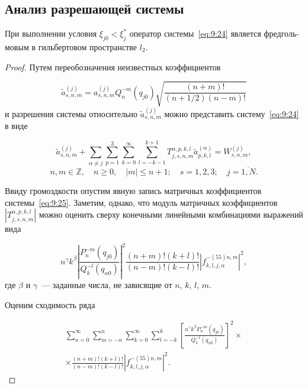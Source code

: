 \begin{russian}
\section{Анализ разрешающей системы}

\begin{theorem}
При выполнении условия ${\xi _{j0}} < \xi _j^*$ оператор системы~\eqref{eq:9:24} является фредгольмовым в гильбертовом пространстве $l_2$.
\end{theorem}

\begin{proof}
Путем переобозначения неизвестных коэффициентов

\begin{equation}
\tilde a_{s,n,m}^{(j)} = a_{s,n,m}^{(j)}Q_n^{ - m}({q_{j0}})\sqrt {\frac{{(n + m)!}}{{(n + 1/2)(n - m)!}}}
\end{equation}
и разрешения системы относительно $\tilde a_{s,n,m}^{(j)}$ можно представить систему~\eqref{eq:9:24} в виде

\begin{equation}
\tilde a_{s,n,m}^{(j)} + \sum\limits_{\alpha\neq j}\sum\limits_{p = 1}^3 {\sum\limits_{k = 0}^\infty  {\sum\limits_{l =  - k - 1}^{k + 1} {T_{j,s,n,m}^{\alpha,p,k,l}} } } \tilde a_{p,k,l}^{(\alpha)} = W_{s,n,m}^{(j)},
\label{eq:9:25}
\end{equation}
$$n,m \in\mathbb{Z},\quad n \ge 0,\quad |m| \le n + 1;\quad s = 1,2,3;\quad j = \overline{1,N}.$$

Ввиду громоздкости опустим явную запись матричных коэффициентов системы~\eqref{eq:9:25}. Заметим, однако, что модуль матричных коэффициентов $\left|T_{j,s,n,m}^{\alpha,p,k,l}\right|$ можно оценить сверху конечными линейными комбинациями выражений вида

\begin{equation}
{n^\gamma }{k^\beta }{\left| {\frac{{P_n^{ - m}\left( {{q_{j0}}} \right)}}{{Q_k^{ - l}\left( {{q _{\alpha 0}}} \right)}}} \right|^2}\frac{{(n + m)!(k + l)!}}{{(n - m)!(k - l)!}}{\left| {f_{k,l,j,\alpha}^{-(55)n,m}} \right|^2},
\label{eq:9:26}
\end{equation}
где $\beta$ и $\gamma$~--- заданные числа, не зависящие от $n$, $k$, $l$, $m$.

Оценим сходимость ряда

\begin{multline}
\sum\limits_{n = 0}^\infty\sum\limits_{m =  - n}^n\sum\limits_{k = 0}^\infty  \sum\limits_{l =  - k}^k{{\left[ {\frac{{{n^\gamma }{k^\beta }P_n^{ - m}({q_{j0}})}}{{Q_k^{ - l}\left( {{q _{\alpha 0}}} \right)}}} \right]}^2}\times \\
\times\frac{{(n + m)!(k + l)!}}{{(n - m)!(k - l)!}}{{\left| {f_{k,l,j,\alpha}^{-(55)n,m}} \right|}^2}.   
\label{eq:9:27}
\end{multline}


\end{proof}
\end{russian}
